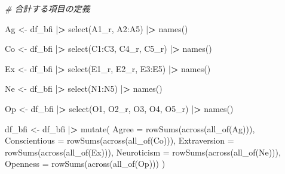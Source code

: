\documentclass[
  xelatex,ja=standard, b5paper]{bxjsbook}
\newenvironment{Shaded}{\begin{snugshade}}{\end{snugshade}}
\newcommand{\AttributeTok}[1]{\textcolor[rgb]{0.77,0.63,0.00}{#1}}
\newcommand{\CommentTok}[1]{\textcolor[rgb]{0.56,0.35,0.01}{\textit{#1}}}
\newcommand{\ErrorTok}[1]{\textcolor[rgb]{0.64,0.00,0.00}{\textbf{#1}}}
\newcommand{\FunctionTok}[1]{\textcolor[rgb]{0.00,0.00,0.00}{#1}}
\newcommand{\NormalTok}[1]{#1}
\newcommand{\OtherTok}[1]{\textcolor[rgb]{0.56,0.35,0.01}{#1}}
\newcommand{\SpecialCharTok}[1]{\textcolor[rgb]{0.00,0.00,0.00}{#1}}
\begin{document}
\begin{Shaded}
\begin{Highlighting}[]
\CommentTok{\# 合計する項目の定義}

\NormalTok{Ag }\OtherTok{\textless{}{-}} 
\NormalTok{df\_bfi }\SpecialCharTok{|}\ErrorTok{\textgreater{}} 
  \FunctionTok{select}\NormalTok{(A1\_r, A2}\SpecialCharTok{:}\NormalTok{A5) }\SpecialCharTok{|}\ErrorTok{\textgreater{}} 
  \FunctionTok{names}\NormalTok{()}

\NormalTok{Co }\OtherTok{\textless{}{-}} 
\NormalTok{df\_bfi }\SpecialCharTok{|}\ErrorTok{\textgreater{}} 
  \FunctionTok{select}\NormalTok{(C1}\SpecialCharTok{:}\NormalTok{C3, C4\_r, C5\_r) }\SpecialCharTok{|}\ErrorTok{\textgreater{}} 
  \FunctionTok{names}\NormalTok{()}

\NormalTok{Ex }\OtherTok{\textless{}{-}} 
\NormalTok{  df\_bfi }\SpecialCharTok{|}\ErrorTok{\textgreater{}} 
  \FunctionTok{select}\NormalTok{(E1\_r, E2\_r, E3}\SpecialCharTok{:}\NormalTok{E5) }\SpecialCharTok{|}\ErrorTok{\textgreater{}} 
  \FunctionTok{names}\NormalTok{()}

\NormalTok{Ne }\OtherTok{\textless{}{-}} 
\NormalTok{df\_bfi }\SpecialCharTok{|}\ErrorTok{\textgreater{}} 
  \FunctionTok{select}\NormalTok{(N1}\SpecialCharTok{:}\NormalTok{N5) }\SpecialCharTok{|}\ErrorTok{\textgreater{}} 
  \FunctionTok{names}\NormalTok{()}

\NormalTok{Op }\OtherTok{\textless{}{-}} 
\NormalTok{df\_bfi }\SpecialCharTok{|}\ErrorTok{\textgreater{}} 
  \FunctionTok{select}\NormalTok{(O1, O2\_r, O3, O4, O5\_r) }\SpecialCharTok{|}\ErrorTok{\textgreater{}} 
  \FunctionTok{names}\NormalTok{()}


\NormalTok{df\_bfi }\OtherTok{\textless{}{-}} 
\NormalTok{  df\_bfi }\SpecialCharTok{|}\ErrorTok{\textgreater{}} 
  \FunctionTok{mutate}\NormalTok{(}
    \AttributeTok{Agree         =} \FunctionTok{rowSums}\NormalTok{(}\FunctionTok{across}\NormalTok{(}\FunctionTok{all\_of}\NormalTok{(Ag))),}
    \AttributeTok{Conscientious =} \FunctionTok{rowSums}\NormalTok{(}\FunctionTok{across}\NormalTok{(}\FunctionTok{all\_of}\NormalTok{(Co))),}
    \AttributeTok{Extraversion  =} \FunctionTok{rowSums}\NormalTok{(}\FunctionTok{across}\NormalTok{(}\FunctionTok{all\_of}\NormalTok{(Ex))),}
    \AttributeTok{Neuroticism   =} \FunctionTok{rowSums}\NormalTok{(}\FunctionTok{across}\NormalTok{(}\FunctionTok{all\_of}\NormalTok{(Ne))),}
    \AttributeTok{Openness      =} \FunctionTok{rowSums}\NormalTok{(}\FunctionTok{across}\NormalTok{(}\FunctionTok{all\_of}\NormalTok{(Op)))}
\NormalTok{    )}
\end{Highlighting}
\end{Shaded}
\end{document}
